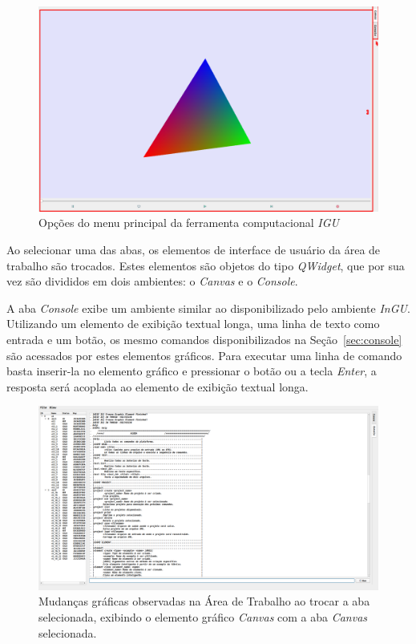 \begin{figure}[!htbp]
	\centering
	\includegraphics[width=\linewidth]{Figures/IGU_001a_34.png}
	\caption{Opções do menu principal da ferramenta computacional \textit{IGU}}
	\label{fig:abas}
\end{figure}

Ao selecionar uma das abas, os elementos de interface de usuário da área de trabalho são trocados. Estes elementos são objetos do tipo \textit{QWidget}, que por sua vez são divididos em dois ambientes: o \textit{Canvas} e o \textit{Console}. 

A aba \textit{Console} exibe um ambiente similar ao disponibilizado pelo ambiente \textit{InGU}. Utilizando um elemento de exibição textual longa, uma linha de texto como entrada e um botão, os mesmo comandos disponibilizados na Seção~\ref{sec:console} são acessados por estes elementos gráficos. Para executar uma linha de comando basta inserir-la no elemento gráfico e pressionar o botão ou a tecla \textit{Enter}, a resposta será acoplada ao elemento de exibição textual longa.

\begin{figure}
	\centering
	\includegraphics[width=.9\linewidth]{Figures/IGU_017.png}
	\caption{Mudanças gráficas observadas na Área de Trabalho ao trocar a aba selecionada, exibindo o elemento gráfico \textit{Canvas} com a aba \textit{Canvas} selecionada.}
	\label{fig:sfig1}
\end{figure}

